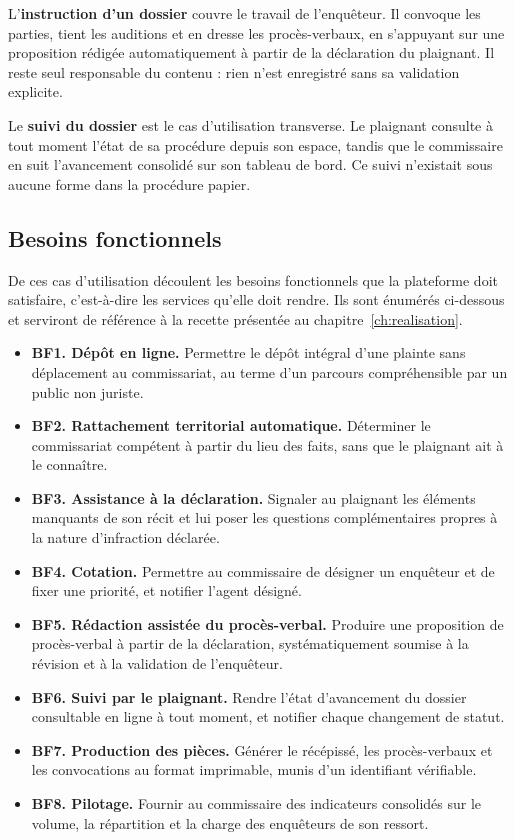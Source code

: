 L'\textbf{instruction d'un dossier} couvre le travail de l'enquêteur. Il convoque les parties, tient les auditions et en dresse les procès-verbaux, en s'appuyant sur une proposition rédigée automatiquement à partir de la déclaration du plaignant. Il reste seul responsable du contenu : rien n'est enregistré sans sa validation explicite.

Le \textbf{suivi du dossier} est le cas d'utilisation transverse. Le plaignant consulte à tout moment l'état de sa procédure depuis son espace, tandis que le commissaire en suit l'avancement consolidé sur son tableau de bord. Ce suivi n'existait sous aucune forme dans la procédure papier.

\subsection{Besoins fonctionnels}

De ces cas d'utilisation découlent les besoins fonctionnels que la plateforme doit satisfaire, c'est-à-dire les services qu'elle doit rendre. Ils sont énumérés ci-dessous et serviront de référence à la recette présentée au chapitre~\ref{ch:realisation}.

\begin{itemize}
    \item \textbf{BF1. Dépôt en ligne.} Permettre le dépôt intégral d'une plainte sans déplacement au commissariat, au terme d'un parcours compréhensible par un public non juriste.
    \item \textbf{BF2. Rattachement territorial automatique.} Déterminer le commissariat compétent à partir du lieu des faits, sans que le plaignant ait à le connaître.
    \item \textbf{BF3. Assistance à la déclaration.} Signaler au plaignant les éléments manquants de son récit et lui poser les questions complémentaires propres à la nature d'infraction déclarée.
    \item \textbf{BF4. Cotation.} Permettre au commissaire de désigner un enquêteur et de fixer une priorité, et notifier l'agent désigné.
    \item \textbf{BF5. Rédaction assistée du procès-verbal.} Produire une proposition de procès-verbal à partir de la déclaration, systématiquement soumise à la révision et à la validation de l'enquêteur.
    \item \textbf{BF6. Suivi par le plaignant.} Rendre l'état d'avancement du dossier consultable en ligne à tout moment, et notifier chaque changement de statut.
    \item \textbf{BF7. Production des pièces.} Générer le récépissé, les procès-verbaux et les convocations au format imprimable, munis d'un identifiant vérifiable.
    \item \textbf{BF8. Pilotage.} Fournir au commissaire des indicateurs consolidés sur le volume, la répartition et la charge des enquêteurs de son ressort.
\end{itemize}


